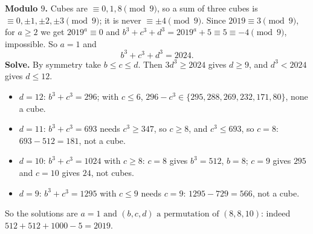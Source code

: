 \textbf{Modulo $9$.} Cubes are $\equiv0,1,8\pmod9$, so a sum of three cubes is $\equiv0,\pm1,\pm2,\pm3\pmod9$; it is never $\equiv\pm4\pmod9$. Since $2019\equiv3\pmod9$, for $a\ge2$ we get $2019^a\equiv0$ and $b^3+c^3+d^3=2019^a+5\equiv5\equiv-4\pmod9$, impossible. So $a=1$ and
\[
b^3+c^3+d^3=2024 .
\]
\textbf{Solve.} By symmetry take $b\le c\le d$. Then $3d^3\ge2024$ gives $d\ge9$, and $d^3<2024$ gives $d\le12$.
\begin{itemize}
\item $d=12$: $b^3+c^3=296$; with $c\le6$, $296-c^3\in\{295,288,269,232,171,80\}$, none a cube.
\item $d=11$: $b^3+c^3=693$ needs $c^3\ge347$, so $c\ge8$, and $c^3\le693$, so $c=8$: $693-512=181$, not a cube.
\item $d=10$: $b^3+c^3=1024$ with $c\ge8$: $c=8$ gives $b^3=512$, $b=8$; $c=9$ gives $295$ and $c=10$ gives $24$, not cubes.
\item $d=9$: $b^3+c^3=1295$ with $c\le9$ needs $c=9$: $1295-729=566$, not a cube.
\end{itemize}
So the solutions are $\boxed{a=1\text{ and }(b,c,d)\text{ a permutation of }(8,8,10)}$: indeed $512+512+1000-5=2019$.

